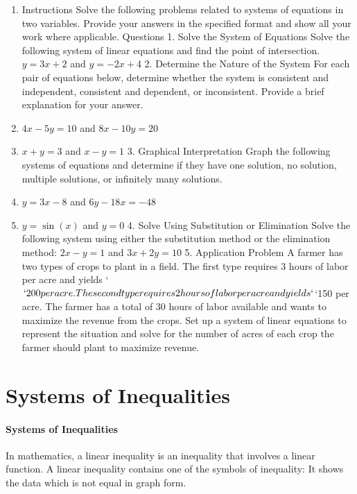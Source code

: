 \begin{enumerate}
    \item Instructions Solve the following problems related to systems of equations in two variables. Provide your answers in the specified format and show all your work where applicable. Questions 1. Solve the System of Equations Solve the following system of linear equations and find the point of intersection. $y = 3x + 2$ and $y = -2x + 4$ 2. Determine the Nature of the System For each pair of equations below, determine whether the system is consistent and independent, consistent and dependent, or inconsistent. Provide a brief explanation for your answer.
    \item $4x - 5y = 10$ and  $8x - 10y = 20$
    \item $x + y = 3$ and $x - y = 1$ 3. Graphical Interpretation Graph the following systems of equations and determine if they have one solution, no solution, multiple solutions, or infinitely many solutions.
    \item $y = 3x - 8$ and $6y - 18x = -48$
    \item $y = \sin(x)$ and $y = 0$ 4. Solve Using Substitution or Elimination Solve the following system using either the substitution method or the elimination method: $2x - y = 1$ and $3x + 2y = 10$ 5. Application Problem A farmer has two types of crops to plant in a field. The first type requires 3 hours of labor per acre and yields `$`200 per acre. The second type requires 2 hours of labor per acre and yields `$`150 per acre. The farmer has a total of 30 hours of labor available and wants to maximize the revenue from the crops. Set up a system of linear equations to represent the situation and solve for the number of acres of each crop the farmer should plant to maximize revenue.
\end{enumerate}

\section{Systems of Inequalities}
\label{sec:systems-of-inequalities}

\paragraph{Systems of Inequalities}

In mathematics, a linear inequality is an inequality that involves a linear function. A linear inequality contains one of the symbols of inequality: It shows the data which is not equal in graph form.

